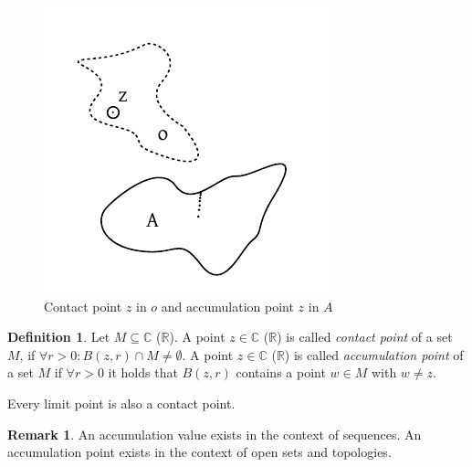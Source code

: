 \documentclass[a4paper,landscape,twocolumn]{article}
\theoremstyle{definition}
\newtheorem{defi}{Definition}
\newtheorem{rem}{Remark}
\begin{document}
\begin{figure}[!h]
  \begin{center}
    \includegraphics{img/topology.pdf}
    \caption{Contact point $z$ in $o$ and accumulation point $z$ in $A$}
    \label{img:cont-accu}
  \end{center}
\end{figure}

\begin{defi}
  Let $M \subseteq \mathbb C$ ($\mathbb R$).
  A point $z \in \mathbb C$ ($\mathbb R$) is called \emph{contact point}
  of a set $M$, if $\forall r > 0: B(z, r) \cap M \neq \emptyset$.
  A point $z \in \mathbb C$ ($\mathbb R$) is called \emph{accumulation point}
  of a set $M$ if $\forall r > 0$ it holds that $B(z, r)$ contains a point
  $w \in M$ with $w \neq z$.

  Every limit point is also a contact point.
\end{defi}

\begin{rem}
  An accumulation value exists in the context of sequences.
  An accumulation point exists in the context of open sets and topologies.
\end{rem}
\end{document}

